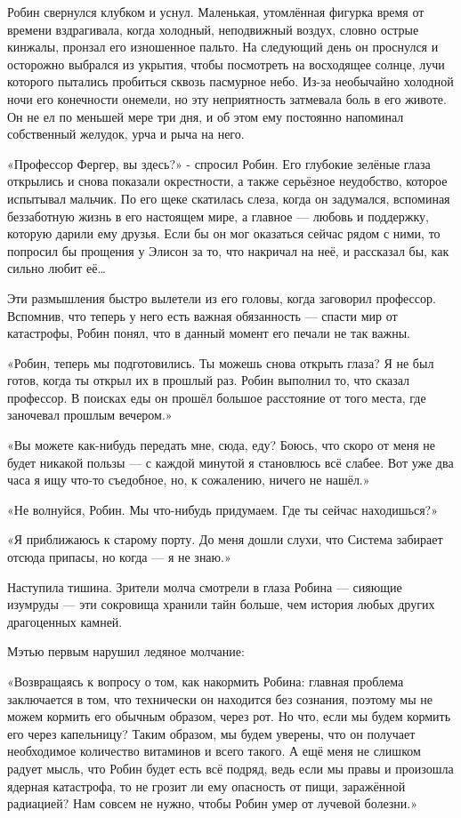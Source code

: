 \documentclass[a4paper,12pt]{book}
\begin{document}
\par
Робин свернулся клубком и уснул. Маленькая, утомлённая фигурка время от времени вздрагивала, когда холодный, неподвижный воздух, словно острые кинжалы, пронзал его изношенное пальто. На следующий день он проснулся и осторожно выбрался из укрытия, чтобы посмотреть на восходящее солнце, лучи которого пытались пробиться сквозь пасмурное небо. Из-за необычайно холодной ночи его конечности онемели, но эту неприятность затмевала боль в его животе. Он не ел по меньшей мере три дня, и об этом ему постоянно напоминал собственный желудок, урча и рыча на него.\\
\par
«Профессор Фергер, вы здесь?» - спросил Робин. Его глубокие зелёные глаза открылись и снова показали окрестности, а также серьёзное неудобство, которое испытывал мальчик. По его щеке скатилась слеза, когда он задумался, вспоминая беззаботную жизнь в его настоящем мире, а главное — любовь и поддержку, которую дарили ему друзья. Если бы он мог оказаться сейчас рядом с ними, то попросил бы прощения у Элисон за то, что накричал на неё, и рассказал бы, как сильно любит её…
\par
Эти размышления быстро вылетели из его головы, когда заговорил профессор. Вспомнив, что теперь у него есть важная обязанность — спасти мир от катастрофы, Робин понял, что в данный момент его печали не так важны.
\par
«Робин, теперь мы подготовились. Ты можешь снова открыть глаза? Я не был готов, когда ты открыл их в прошлый раз. Робин выполнил то, что сказал профессор. В поисках еды он прошёл большое расстояние от того места, где заночевал прошлым вечером.»
\par
«Вы можете как-нибудь передать мне, сюда, еду? Боюсь, что скоро от меня не будет никакой пользы — с каждой минутой я становлюсь всё слабее. Вот уже два часа я ищу что-то съедобное, но, к сожалению, ничего не нашёл.»
\par
«Не волнуйся, Робин. Мы что-нибудь придумаем. Где ты сейчас находишься?»
\par
«Я приближаюсь к старому порту. До меня дошли слухи, что Система забирает отсюда припасы, но когда — я не знаю.»
\par
Наступила тишина. Зрители молча смотрели в глаза Робина — сияющие изумруды — эти сокровища хранили тайн больше, чем история любых других драгоценных камней.
\par
Мэтью первым нарушил ледяное молчание:
\par
«Возвращаясь к вопросу о том, как накормить Робина: главная проблема заключается в том, что технически он находится без сознания, поэтому мы не можем кормить его обычным образом, через рот. Но что, если мы будем кормить его через капельницу? Таким образом, мы будем уверены, что он получает необходимое количество витаминов и всего такого. А ещё меня не слишком радует мысль, что Робин будет есть всё подряд, ведь если мы правы и произошла ядерная катастрофа, то не грозит ли ему опасность от пищи, заражённой радиацией? Нам совсем не нужно, чтобы Робин умер от лучевой болезни.»
\end{document}
